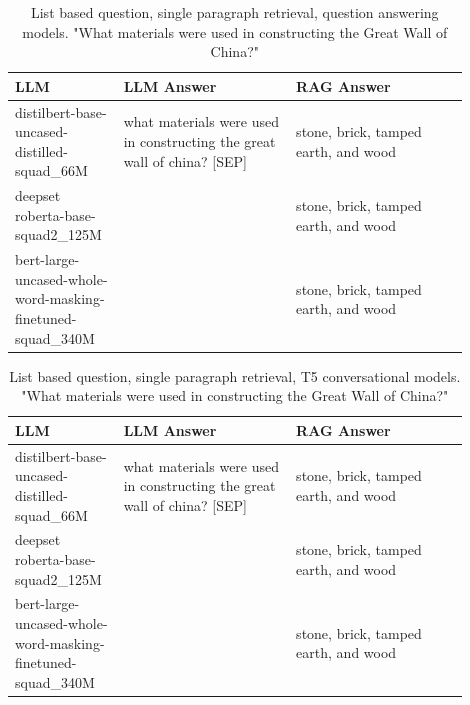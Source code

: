 \documentclass{wseas}
\begin{document}
\begin{table}[htbp]
  \centering
  \caption{List based question, single paragraph retrieval, question answering models. "What materials were used in constructing the Great Wall of China?"} %
  \label{tab:experiment_R_1_paragraph_Q_listBased_M_QaModels_table}  %
  \begin{tabular}{|p{0.20\linewidth}|p{0.35\linewidth}|p{0.35\linewidth}|}
    \hline
    \textbf{LLM} & \textbf{LLM Answer} & \textbf{RAG Answer} \\
    \hline
    distilbert-base-uncased-distilled-squad\_66M & what materials were used in constructing the great wall of china? {[}SEP{]} & stone, brick, tamped earth, and wood \\
    \hline
    deepset roberta-base-squad2\_125M & & stone, brick, tamped earth, and wood \\
    \hline
    bert-large-uncased-whole-word-masking-finetuned-squad\_340M & & stone, brick, tamped earth, and wood \\
    \hline
  \end{tabular}
\end{table}
\begin{table}[htbp]
  \centering
  \caption{List based question, single paragraph retrieval, T5 conversational models. "What materials were used in constructing the Great Wall of China?"}
  \label{tab:experiment_R_1_paragraph_Q_listBased_M_T5Models_table}  %
  \begin{tabular}{|p{0.20\linewidth}|p{0.35\linewidth}|p{0.35\linewidth}|}
    \hline
    \textbf{LLM} & \textbf{LLM Answer} & \textbf{RAG Answer} \\
    \hline
    distilbert-base-uncased-distilled-squad\_66M & what materials were used in constructing the great wall of china? {[}SEP{]} & stone, brick, tamped earth, and wood \\
    \hline
    deepset roberta-base-squad2\_125M & & stone, brick, tamped earth, and wood \\
    \hline
    bert-large-uncased-whole-word-masking-finetuned-squad\_340M & & stone, brick, tamped earth, and wood \\
    \hline
  \end{tabular}
\end{table}
\end{document}
